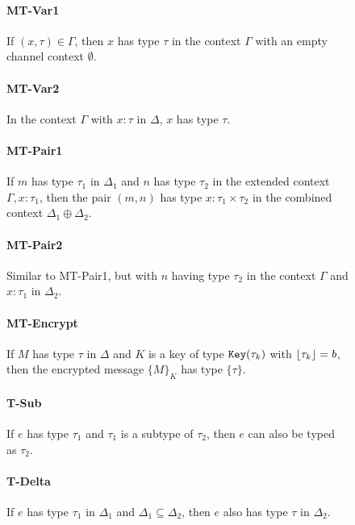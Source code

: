 \documentclass[master,english]{kuisthesis}
\theoremstyle{definition}
\begin{document}
\begin{figure}
\paragraph{MT-Var1} If \((x, \tau) \in \Gamma\), then \(x\) has type \(\tau\) in the context \(\Gamma\) with an empty channel context \(\emptyset\).



\paragraph{MT-Var2} In the context \(\Gamma\) with \(x{:}\tau\) in \(\Delta\), \(x\) has type \(\tau\).

\paragraph{MT-Pair1} If \(m\) has type \(\tau_1\) in \(\Delta_1\) and \(n\) has type \(\tau_2\) in the extended context \(\Gamma,x{:}\tau_1\), then the pair \((m, n)\) has type \(x{:}\tau_1 \times \tau_2\) in the combined context \(\Delta_1 \oplus \Delta_2\).

\paragraph{MT-Pair2} Similar to MT-Pair1, but with \(n\) having type \(\tau_2\) in the context \(\Gamma\) and \(x{:}\tau_1\) in \(\Delta_2\).

\paragraph{MT-Encrypt} If \(M\) has type \(\tau\) in \(\Delta\) and \(K\) is a key of type \({\tt Key}({\tau_k})\) with \(\lfloor {\tau_k} \rfloor = b\), then the encrypted message \(\{M\}_K\) has type \(\{\tau\}\).

\paragraph{T-Sub} If \(e\) has type \(\tau_1\) and \(\tau_1\) is a subtype of \(\tau_2\), then \(e\) can also be typed as \(\tau_2\).

\paragraph{T-Delta} If \(e\) has type \(\tau_1\) in \(\Delta_1\) and \(\Delta_1 \subseteq \Delta_2\), then \(e\) also has type \(\tau\) in \(\Delta_2\).
\end{figure}
\end{document}
